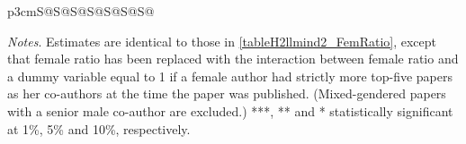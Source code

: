 \begin{table}[H]
\begin{threeparttable}
\begin{tabular}{p{3cm}S@{}S@{}S@{}S@{}S@{}S@{}S@{}}
            \bottomrule
        \end{tabular}
        \begin{tablenotes}
            \tiny
            \item \textit{Notes}. Estimates are identical to those in \autoref{tableH2llmind2_FemRatio}, except that female ratio has been replaced with the interaction between female ratio and a dummy variable equal to 1 if a female author had strictly more top-five papers as her co-authors at the time the paper was published. (Mixed-gendered papers with a senior male co-author are excluded.) ***, ** and * statistically significant at 1\%, 5\% and 10\%, respectively.
        \end{tablenotes}
    \end{threeparttable}
\end{table}